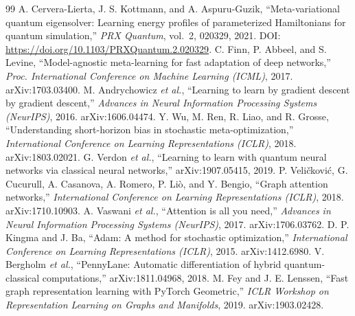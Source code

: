 \documentclass{ssnreview}
\begin{document}
\begin{thebibliography}{99}
 A. Cervera-Lierta, J. S. Kottmann, and A. Aspuru-Guzik, ``Meta-variational quantum eigensolver: Learning energy profiles of parameterized Hamiltonians for quantum simulation,'' \textit{PRX Quantum}, vol.~2, 020329, 2021. DOI: \url{https://doi.org/10.1103/PRXQuantum.2.020329}.
 C. Finn, P. Abbeel, and S. Levine, ``Model-agnostic meta-learning for fast adaptation of deep networks,'' \textit{Proc. International Conference on Machine Learning (ICML)}, 2017. arXiv:1703.03400.
 M. Andrychowicz \textit{et al.}, ``Learning to learn by gradient descent by gradient descent,'' \textit{Advances in Neural Information Processing Systems (NeurIPS)}, 2016. arXiv:1606.04474.
 Y. Wu, M. Ren, R. Liao, and R. Grosse, ``Understanding short-horizon bias in stochastic meta-optimization,'' \textit{International Conference on Learning Representations (ICLR)}, 2018. arXiv:1803.02021.
 G. Verdon \textit{et al.}, ``Learning to learn with quantum neural networks via classical neural networks,'' arXiv:1907.05415, 2019.
 P. Veli\v{c}kovi\'{c}, G. Cucurull, A. Casanova, A. Romero, P. Li\`{o}, and Y. Bengio, ``Graph attention networks,'' \textit{International Conference on Learning Representations (ICLR)}, 2018. arXiv:1710.10903.
 A. Vaswani \textit{et al.}, ``Attention is all you need,'' \textit{Advances in Neural Information Processing Systems (NeurIPS)}, 2017. arXiv:1706.03762.
 D. P. Kingma and J. Ba, ``Adam: A method for stochastic optimization,'' \textit{International Conference on Learning Representations (ICLR)}, 2015. arXiv:1412.6980.
 V. Bergholm \textit{et al.}, ``PennyLane: Automatic differentiation of hybrid quantum-classical computations,'' arXiv:1811.04968, 2018.
 M. Fey and J. E. Lenssen, ``Fast graph representation learning with PyTorch Geometric,'' \textit{ICLR Workshop on Representation Learning on Graphs and Manifolds}, 2019. arXiv:1903.02428.
\end{thebibliography}
\end{document}
